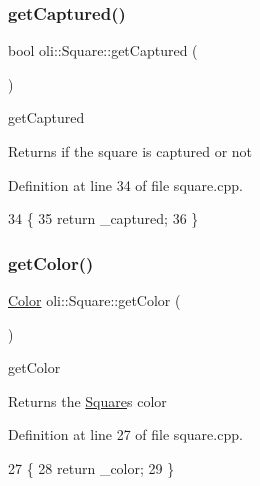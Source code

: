 \subsubsection{\texorpdfstring{get\+Captured()}{getCaptured()}}
{\footnotesize\ttfamily bool oli\+::\+Square\+::get\+Captured (\begin{DoxyParamCaption}{ }\end{DoxyParamCaption})}



get\+Captured 

\begin{DoxyReturn}{Returns}
if the square is captured or not 
\end{DoxyReturn}


Definition at line 34 of file square.\+cpp.


\begin{DoxyCode}
34                         \{
35     \textcolor{keywordflow}{return} \_captured;
36 \}
\end{DoxyCode}
\hypertarget{classoli_1_1_square_a7709b35684fb5754e53d138bb916880c}{}\label{classoli_1_1_square_a7709b35684fb5754e53d138bb916880c} 
\subsubsection{\texorpdfstring{get\+Color()}{getColor()}}
{\footnotesize\ttfamily \hyperlink{namespaceoli_aac44697e43b3ab2ad32fe892ab2276eb}{Color} oli\+::\+Square\+::get\+Color (\begin{DoxyParamCaption}{ }\end{DoxyParamCaption})}



get\+Color 

\begin{DoxyReturn}{Returns}
the \hyperlink{classoli_1_1_square}{Square}\textquotesingle{}s color 
\end{DoxyReturn}


Definition at line 27 of file square.\+cpp.


\begin{DoxyCode}
27                       \{
28     \textcolor{keywordflow}{return} \_color;
29 \}
\end{DoxyCode}
\hypertarget{classoli_1_1_square_aff2077d95454b98d160c587f13eb10e7}{}\label{classoli_1_1_square_aff2077d95454b98d160c587f13eb10e7} 
